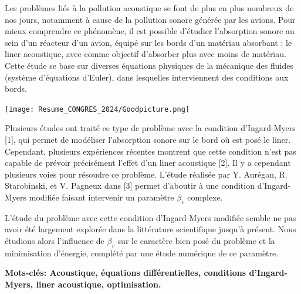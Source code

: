 \documentclass[12pt,a4paper]{article}
\begin{document}

Les problèmes liés à la pollution acoustique se font de plus en plus nombreux de nos jours, notamment à cause de la pollution sonore générée par les avions. Pour mieux comprendre ce phénomène, il est possible d'étudier l'absorption sonore au sein d'un réacteur d'un avion, équipé sur les bords d'un matériau absorbant : le liner acoustique, avec comme objectif d'absorber plus avec moins de matériau. Cette étude se base sur diverses équations physiques de la mécanique des fluides (système d'équations d'Euler), dans lesquelles interviennent des conditions aux bords.\par
\vspace{-0.1cm}
\begin{center}
    \texttt{[image: Resume\_CONGRES\_2024/Goodpicture.png]}
\end{center}\par
\vspace{-0.1cm}
Plusieurs études ont traité ce type de problème avec la condition d'Ingard-Myers [1], qui permet de modéliser l'absorption sonore sur le bord où est posé le liner. Cependant, plusieurs expériences récentes montrent que cette condition n'est pas capable de prévoir précisément l'effet d'un liner acoustique [2]. Il y a cependant plusieurs voies pour résoudre ce problème. L'étude réalisée par Y. Aurégan, R. Starobinski, et V. Pagneux dans [3] permet d'aboutir à une condition d'Ingard-Myers modifiée faisant intervenir un paramètre $\beta_v$ complexe.\par
L'étude du problème avec cette condition d'Ingard-Myers modifiée semble ne pas avoir été largement explorée dans la littérature scientifique jusqu'à présent. Nous étudions alors l'influence de $\beta_v$ sur le caractère bien posé du problème et la minimisation d'énergie, complété par une étude numérique de ce paramètre.

\medskip
\noindent \textbf{Mots-clés: Acoustique, équations différentielles, conditions d'Ingard-Myers, liner acoustique, optimisation.}\par
\end{document}
